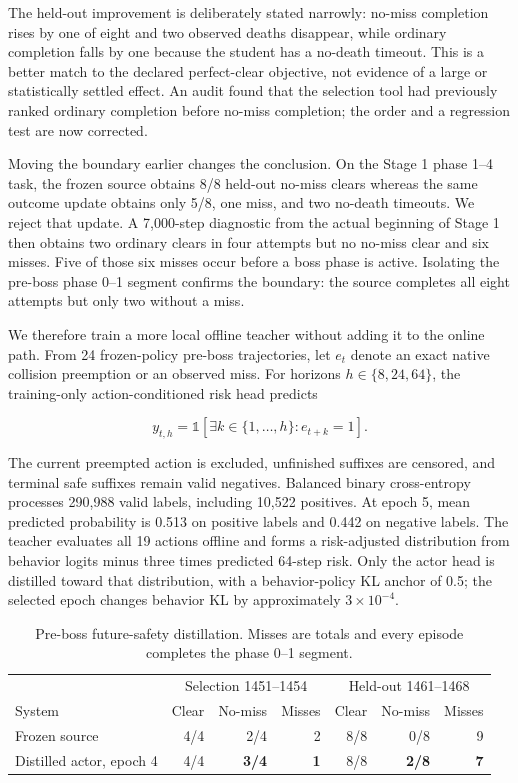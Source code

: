 \documentclass[10pt]{article}
\begin{document}
The held-out improvement is deliberately stated narrowly: no-miss completion
rises by one of eight and two observed deaths disappear, while ordinary
completion falls by one because the student has a no-death timeout.  This is a
better match to the declared perfect-clear objective, not evidence of a large
or statistically settled effect.  An audit found that the selection tool had
previously ranked ordinary completion before no-miss completion; the order and
a regression test are now corrected.

Moving the boundary earlier changes the conclusion.  On the Stage 1 phase
1--4 task, the frozen source obtains 8/8 held-out no-miss clears whereas the
same outcome update obtains only 5/8, one miss, and two no-death timeouts.  We
reject that update.  A 7,000-step diagnostic from the actual beginning of Stage
1 then obtains two ordinary clears in four attempts but no no-miss clear and
six misses.  Five of those six misses occur before a boss phase is active.
Isolating the pre-boss phase 0--1 segment confirms the boundary: the source
completes all eight attempts but only two without a miss.

We therefore train a more local offline teacher without adding it to the
online path.  From 24 frozen-policy pre-boss trajectories, let $e_t$ denote an
exact native collision preemption or an observed miss.  For horizons
$h\in\{8,24,64\}$, the training-only action-conditioned risk head predicts

\begin{equation}
  y_{t,h}=\mathbb{1}\!\left[\exists k\in\{1,\ldots,h\}:e_{t+k}=1\right].
\end{equation}

The current preempted action is excluded, unfinished suffixes are censored,
and terminal safe suffixes remain valid negatives.  Balanced binary
cross-entropy processes 290,988 valid labels, including 10,522 positives.  At
epoch 5, mean predicted probability is 0.513 on positive labels and 0.442 on
negative labels.  The teacher evaluates all 19 actions offline and forms a
risk-adjusted distribution from behavior logits minus three times predicted
64-step risk.  Only the actor head is distilled toward that distribution, with
a behavior-policy KL anchor of 0.5; the selected epoch changes behavior KL by
approximately $3\times10^{-4}$.

\begin{table}[ht]
  \centering
  \caption{Pre-boss future-safety distillation.  Misses are totals and every
  episode completes the phase 0--1 segment.}
  \label{tab:preboss-risk}
  \begin{tabular}{lrrrrrr}
    \toprule
    & \multicolumn{3}{c}{Selection 1451--1454} &
      \multicolumn{3}{c}{Held-out 1461--1468} \\
    System & Clear & No-miss & Misses & Clear & No-miss & Misses \\
    \midrule
    Frozen source & 4/4 & 2/4 & 2 & 8/8 & 0/8 & 9 \\
    Distilled actor, epoch 4 & 4/4 & \textbf{3/4} & \textbf{1} &
      8/8 & \textbf{2/8} & \textbf{7} \\
    \bottomrule
  \end{tabular}
\end{table}
\end{document}
